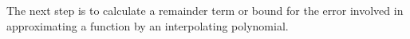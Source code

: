 %
%
%
%
%
%
%
The next step is to calculate a remainder term or bound for the error involved in approximating a function by an interpolating polynomial.


